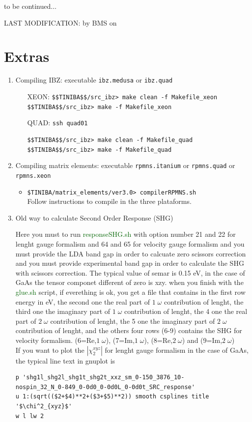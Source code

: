 \documentclass[12pt,leqno]{article}
\numberwithin{equation}{section}
\begin{document}
to be continued$\ldots$

LAST MODIFICATION: by BMS on \date{\today }

\appendix

\section{Extras}


\begin{enumerate}
%
\item Compiling IBZ: executable \verb=ibz.medusa= or \verb=ibz.quad=
\begin{itemize}
\item[XEON:] \verb=$$TINIBA$$/src_ibz> make clean -f Makefile_xeon= 
\verb=$$TINIBA$$/src_ibz> make -f Makefile_xeon= 
\item[QUAD:]\verb=ssh quad01=

\verb=$$TINIBA$$/src_ibz> make clean -f Makefile_quad= 
\verb=$$TINIBA$$/src_ibz> make -f Makefile_quad= 
\end{itemize}
%
\item Compiling matrix elements: executable \verb=rpmns.itanium= or
  \verb=rpmns.quad= or \verb=rpmns.xeon=
\begin{itemize}
\item \verb=$TINIBA/matrix_elements/ver3.0> compilerRPMNS.sh=\\
Follow instructions to compile in the three plataforms.
\end{itemize}
%
\item Old way to calculate Second Order Response (SHG)
 
Here you must to run \textcolor{darkgreen}{responseSHG.sh} with option number 21 and 22 for lenght
 gauge formalism and 64 and 65 for velocity gauge formalism and you must provide the LDA band gap 
 in order to calcuate zero scissors correction and you must provide experimental band gap in order to 
calculate the SHG with scissors correction. The typical value of semar is 0.15 eV, in the case of GaAs 
 the tensor componet different of zero is xzy.
when you finish with the \textcolor{darkgreen}{glue.sh} script, if everething is ok, you get  a file
that contains in the first row energy in eV,  the second one the real part of $1\;\omega$ contribution of lenght, 
the third one the imaginary part of $1\;\omega$ contribution of lenght,  
the 4 one the real part of $2\;\omega$ contribution of lenght, 
the 5 one the imaginary part of $2\;\omega$ contribution of lenght, and the others four rows (6-9)
contains the SHG for velocity formalism. (6=Re,$1\;\omega$), (7=Im,$1\;\omega$), (8=Re,$2\;\omega$) and 
(9=Im,$2\;\omega$)\\
If you want to plot the $|\chi_2^{xyz}|$ for lenght gauge formalism in the case of GaAs, the typical line text in gnuplot is 
\begin{verbatim}
p 'shg1l_shg2l_shg1t_shg2t_xxz_sm_0-150_3876_10-
nospin_32_N_0-849_0-0d0_0-0d0L_0-0d0t_SRC_response'  
u 1:(sqrt(($2+$4)**2+($3+$5)**2)) smooth csplines title '$\chi^2_{xyz}$'
w l lw 2
\end{verbatim}


\end{enumerate}
\end{document}
